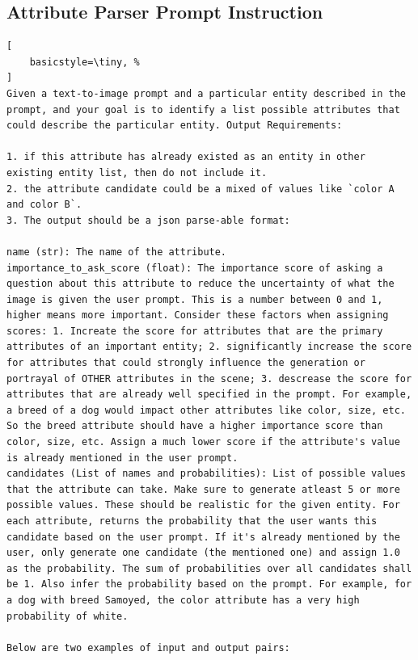 \subsection{Attribute Parser Prompt Instruction} \label{ssec:attribute_parser}
\begin{lstlisting}[
    basicstyle=\tiny, %
]
Given a text-to-image prompt and a particular entity described in the prompt, and your goal is to identify a list possible attributes that could describe the particular entity. Output Requirements:

1. if this attribute has already existed as an entity in other existing entity list, then do not include it. 
2. the attribute candidate could be a mixed of values like `color A and color B`.
3. The output should be a json parse-able format:

name (str): The name of the attribute.
importance_to_ask_score (float): The importance score of asking a question about this attribute to reduce the uncertainty of what the image is given the user prompt. This is a number between 0 and 1, higher means more important. Consider these factors when assigning scores: 1. Increate the score for attributes that are the primary attributes of an important entity; 2. significantly increase the score for attributes that could strongly influence the generation or portrayal of OTHER attributes in the scene; 3. descrease the score for attributes that are already well specified in the prompt. For example, a breed of a dog would impact other attributes like color, size, etc. So the breed attribute should have a higher importance score than color, size, etc. Assign a much lower score if the attribute's value is already mentioned in the user prompt.
candidates (List of names and probabilities): List of possible values that the attribute can take. Make sure to generate atleast 5 or more possible values. These should be realistic for the given entity. For each attribute, returns the probability that the user wants this candidate based on the user prompt. If it's already mentioned by the user, only generate one candidate (the mentioned one) and assign 1.0 as the probability. The sum of probabilities over all candidates shall be 1. Also infer the probability based on the prompt. For example, for a dog with breed Samoyed, the color attribute has a very high probability of white.

Below are two examples of input and output pairs:


\end{lstlisting}
